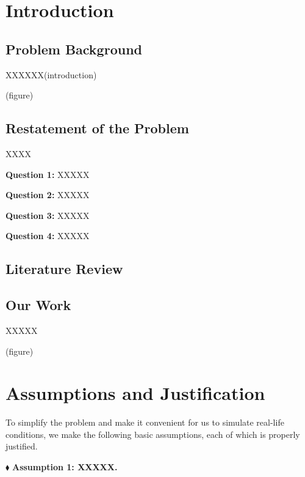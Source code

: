 \documentclass{mcmthesis}
\renewcommand{\contentsname}{\hspace*{\fill}\Large\bfseries Contents \hspace*{\fill}}
\begin{document}
\maketitle

\tableofcontents   %
\thispagestyle{empty}

\newpage

\section{Introduction}

\subsection{Problem Background}

XXXXXX(introduction)

(figure)

\subsection{Restatement of the Problem}

XXXX

{\bf Question 1:} XXXXX

{\bf Question 2:} XXXXX

{\bf Question 3:} XXXXX

{\bf Question 4:} XXXXX

\subsection{Literature Review}

\subsection{Our Work}
XXXXX

(figure)

\section{Assumptions and Justification}

To simplify the problem and make it convenient for us to simulate real-life conditions, we make the following basic assumptions, each of which is properly justified.

$  \blacklozenge $  {\bf Assumption 1: XXXXX.}
\end{document}
